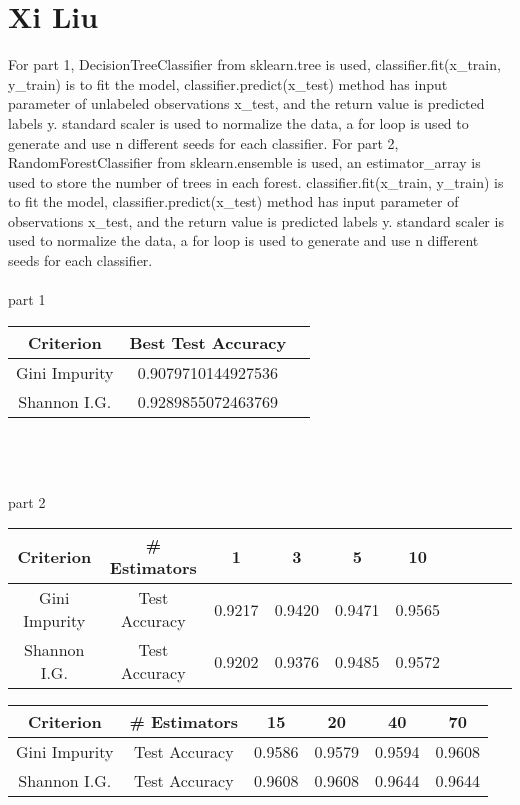 \documentclass[12pt, border = 4pt, multi]{article} %
\begin{document}
\section*{Xi Liu}
For part 1, DecisionTreeClassifier from sklearn.tree is used, classifier.fit(x\_train, y\_train) is to fit the model, classifier.predict(x\_test) method has input parameter of unlabeled observations x\_test, and the return value is predicted labels y. standard scaler is used to normalize the data, a for loop is used to generate and use n different seeds for each classifier. For part 2, RandomForestClassifier from sklearn.ensemble is used, an estimator\_array is used to store the number of trees in each forest. classifier.fit(x\_train, y\_train) is to fit the model, classifier.predict(x\_test) method has input parameter of observations x\_test, and the return value is predicted labels y. standard scaler is used to normalize the data, a for loop is used to generate and use n different seeds for each classifier.\\
\\
part 1
{\huge
\begin{center}
\begin{tabular}{|c|c|c|}\hline
Criterion & Best Test Accuracy\\\hline
Gini Impurity & 0.9079710144927536\\\hline
Shannon I.G. & 0.9289855072463769\\\hline
\end{tabular}
\end{center}
}
\leavevmode
\\
\\
\\
part 2
\begin{center}
\begin{tabular}{|c|c|c|c|c|c|c|c|c|c|}\hline
Criterion & \# Estimators & 1 & 3 & 5 & 10\\\hline
Gini Impurity & Test Accuracy & 0.9217 & 0.9420 & 0.9471 & 0.9565\\\hline
Shannon I.G. & Test Accuracy & 0.9202 & 0.9376 & 0.9485 & 0.9572\\\hline
\end{tabular}
\end{center}
\begin{center}
\begin{tabular}{|c|c|c|c|c|c|}\hline
Criterion & \# Estimators & 15 & 20 & 40 & 70\\\hline
Gini Impurity & Test Accuracy & 0.9586 & 0.9579 & 0.9594 & 0.9608\\\hline
Shannon I.G. & Test Accuracy & 0.9608 & 0.9608 & 0.9644 & 0.9644\\\hline
\end{tabular}
\end{center}
\end{document}
